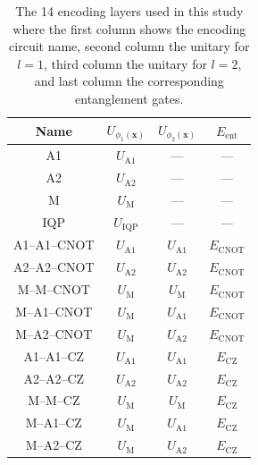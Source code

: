 \documentclass[journal=jacsat,manuscript=article]{achemso}
\begin{document}
\begin{table}[htbp]
	\centering
	\begin{tabular}{|c|c|c|c|}
		\hline
		\textbf{Name} & $U_{\phi_{1}(\mathbf{x})}$ & $U_{\phi_{2}(\mathbf{x})}$ & $E_{\text{ent}}$  \\
		\hline
		\hline
		A1 & $U_{\text{A1}}$ & --- & --- \\
		\hline
		A2 & $U_{\text{A2}}$ & --- & --- \\
		\hline		
		M & $U_{\text{M}}$ & --- & --- \\
		\hline
		IQP & $U_{\text{IQP}}$ & --- & --- \\
		\hline
		A1--A1--CNOT & $U_{\text{A1}}$ & $U_{\text{A1}}$ & $E_{\text{CNOT}}$ \\
		\hline
		 A2--A2--CNOT & $U_{\text{A2}}$ & $U_{\text{A2}}$ & $E_{\text{CNOT}}$ \\
		\hline
		M--M--CNOT & $U_{\text{M}}$ & $U_{\text{M}}$ & $E_{\text{CNOT}}$ \\
		\hline
		M--A1--CNOT & $U_{\text{M}}$ & $U_{\text{A1}}$ & $E_{\text{CNOT}}$ \\
		\hline		
		M--A2--CNOT & $U_{\text{M}}$ & $U_{\text{A2}}$ & $E_{\text{CNOT}}$ \\
		\hline				
		A1--A1--CZ & $U_{\text{A1}}$ & $U_{\text{A1}}$ & $E_{\text{CZ}}$ \\
		\hline
		A2--A2--CZ& $U_{\text{A2}}$ & $U_{\text{A2}}$ & $E_{\text{CZ}}$ \\
		\hline
		M--M--CZ & $U_{\text{M}}$ & $U_{\text{M}}$ & $E_{\text{CZ}}$ \\
		\hline
		M--A1--CZ & $U_{\text{M}}$ & $U_{\text{A1}}$ & $E_{\text{CZ}}$ \\
		\hline		
		M--A2--CZ & $U_{\text{M}}$ & $U_{\text{A2}}$ & $E_{\text{CZ}}$ \\
		\hline						
	\end{tabular}
	\caption{The 14 encoding layers used in this study where the first column shows the encoding circuit name, second column the unitary for $l=1$, third column the unitary for $l=2$, and last column the corresponding entanglement gates.}
	\label{tab:encoders}
\end{table}
\end{document}
